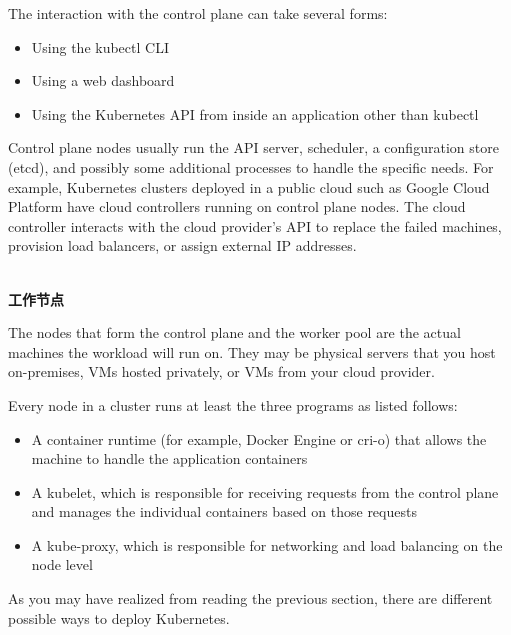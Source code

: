 The interaction with the control plane can take several forms:

\begin{itemize}
\item 
Using the kubectl CLI

\item 
Using a web dashboard

\item 
Using the Kubernetes API from inside an application other than kubectl
\end{itemize}

Control plane nodes usually run the API server, scheduler, a configuration store (etcd), and possibly some additional processes to handle the specific needs. For example, Kubernetes clusters deployed in a public cloud such as Google Cloud Platform have cloud controllers running on control plane nodes. The cloud controller interacts with the cloud provider's API to replace the failed machines, provision load balancers, or assign external IP addresses.

\hspace*{\fill} \\ %
\noindent
\textbf{工作节点}

The nodes that form the control plane and the worker pool are the actual machines the workload will run on. They may be physical servers that you host on-premises, VMs hosted privately, or VMs from your cloud provider.

Every node in a cluster runs at least the three programs as listed follows:

\begin{itemize}
\item 
A container runtime (for example, Docker Engine or cri-o) that allows the machine to handle the application containers

\item 
A kubelet, which is responsible for receiving requests from the control plane and manages the individual containers based on those requests

\item 
A kube-proxy, which is responsible for networking and load balancing on the node level
\end{itemize}


As you may have realized from reading the previous section, there are different possible ways to deploy Kubernetes.


